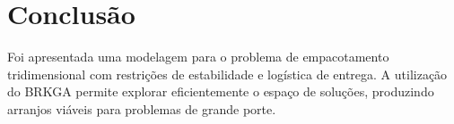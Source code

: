 \documentclass[12pt]{article}
\begin{document}
\section{Conclusão}

Foi apresentada uma modelagem para o problema de empacotamento tridimensional com restrições de estabilidade e logística de entrega. A utilização do BRKGA permite explorar eficientemente o espaço de soluções, produzindo arranjos viáveis para problemas de grande porte.



\end{document}
